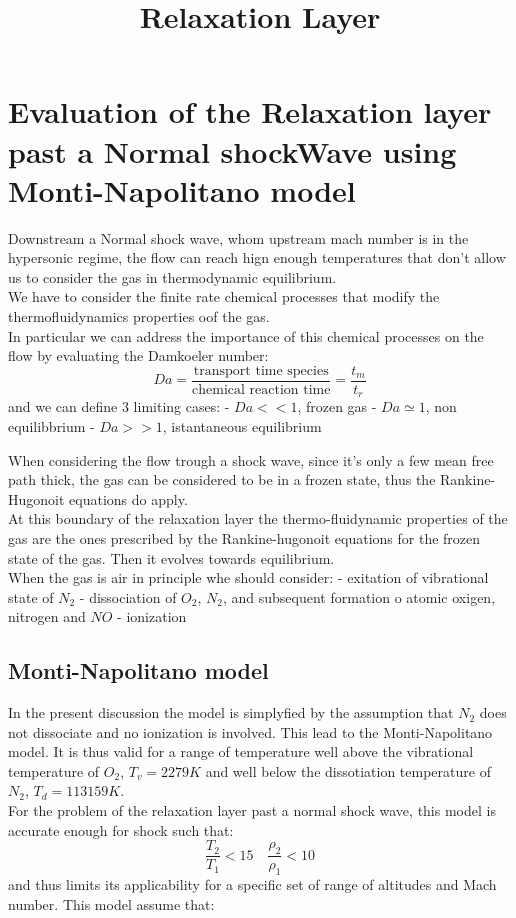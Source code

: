 \documentclass[
]{article}
\title{Relaxation Layer}
\author{}
\date{}
\begin{document}
\maketitle

\hypertarget{evaluation-of-the-relaxation-layer-past-a-normal-shockwave-using-monti-napolitano-model}{%
\section{Evaluation of the Relaxation layer past a Normal shockWave
using Monti-Napolitano
model}\label{evaluation-of-the-relaxation-layer-past-a-normal-shockwave-using-monti-napolitano-model}}

Downstream a Normal shock wave, whom upstream mach number is in the
hypersonic regime, the flow can reach hign enough temperatures that
don't allow us to consider the gas in thermodynamic equilibrium.\\
We have to consider the finite rate chemical processes that modify the
thermofluidynamics properties oof the gas.\\
In particular we can address the importance of this chemical processes
on the flow by evaluating the Damkoeler number: \[
Da=\frac{\text{transport time species}}{\text{chemical reaction time}}=\frac{t_m}{t_r}
\] and we can define 3 limiting cases: - \(Da<<1\), frozen gas -
\(Da\simeq 1\), non equilibbrium - \(Da>>1\), istantaneous equilibrium

When considering the flow trough a shock wave, since it's only a few
mean free path thick, the gas can be considered to be in a frozen state,
thus the Rankine-Hugonoit equations do apply.\\
At this boundary of the relaxation layer the thermo-fluidynamic
properties of the gas are the ones prescribed by the Rankine-hugonoit
equations for the frozen state of the gas. Then it evolves towards
equilibrium.\\
When the gas is air in principle whe should consider: - exitation of
vibrational state of \(N_2\) - dissociation of \(O_2\), \(N_2\), and
subsequent formation o atomic oxigen, nitrogen and \(NO\) - ionization

\hypertarget{monti-napolitano-model}{%
\subsection{Monti-Napolitano model}\label{monti-napolitano-model}}

In the present discussion the model is simplyfied by the assumption that
\(N_2\) does not dissociate and no ionization is involved. This lead to
the Monti-Napolitano model. It is thus valid for a range of temperature
well above the vibrational temperature of \(O_2\), \(T_v=2279K\) and
well below the dissotiation temperature of \(N_2\), \(T_d=113159K\).\\
For the problem of the relaxation layer past a normal shock wave, this
model is accurate enough for shock such that: \[
\frac {T_2}{T_1}<15 \quad \frac{\rho_2}{\rho_1}<10
\] and thus limits its applicability for a specific set of range of
altitudes and Mach number. This model assume that:
\end{document}
